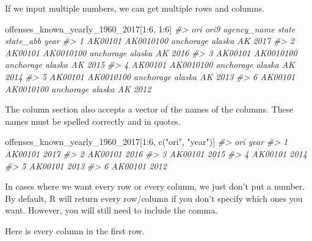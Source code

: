 \documentclass[
]{krantz}
\makeatletter
\newenvironment{Shaded}{\begin{snugshade}}{\end{snugshade}}
\newcommand{\CommentTok}[1]{\textcolor[rgb]{0.37,0.37,0.37}{\textit{#1}}}
\newcommand{\DecValTok}[1]{\textcolor[rgb]{0.06,0.06,0.06}{#1}}
\newcommand{\FunctionTok}[1]{\textcolor[rgb]{0,0,0}{#1}}
\newcommand{\NormalTok}[1]{#1}
\newcommand{\SpecialCharTok}[1]{\textcolor[rgb]{0,0,0}{#1}}
\newcommand{\StringTok}[1]{\textcolor[rgb]{0.5,0.5,0.5}{#1}}
\newenvironment{kframe}{%
\medskip{}
\setlength{\fboxsep}{.8em}
 \def\at@end@of@kframe{}%
 \ifinner\ifhmode%
  \def\at@end@of@kframe{\end{minipage}}%
  \begin{minipage}{\columnwidth}%
 \fi\fi%
 \def\FrameCommand##1{\hskip\@totalleftmargin \hskip-\fboxsep
 \colorbox{shadecolor}{##1}\hskip-\fboxsep
     \hskip-\linewidth \hskip-\@totalleftmargin \hskip\columnwidth}%
 \MakeFramed {\advance\hsize-\width
   \@totalleftmargin\z@ \linewidth\hsize
   \@setminipage}}%
 {\par\unskip\endMakeFramed%
 \at@end@of@kframe}
\renewenvironment{Shaded}{\begin{kframe}}{\end{kframe}}
\makeatother
\begin{document}
If we input multiple numbers, we can get multiple rows and columns.

\begin{Shaded}
\begin{Highlighting}[]
\NormalTok{offenses\_known\_yearly\_1960\_2017[}\DecValTok{1}\SpecialCharTok{:}\DecValTok{6}\NormalTok{, }\DecValTok{1}\SpecialCharTok{:}\DecValTok{6}\NormalTok{]}
\CommentTok{\#\textgreater{}       ori      ori9 agency\_name  state state\_abb year}
\CommentTok{\#\textgreater{} 1 AK00101 AK0010100   anchorage alaska        AK 2017}
\CommentTok{\#\textgreater{} 2 AK00101 AK0010100   anchorage alaska        AK 2016}
\CommentTok{\#\textgreater{} 3 AK00101 AK0010100   anchorage alaska        AK 2015}
\CommentTok{\#\textgreater{} 4 AK00101 AK0010100   anchorage alaska        AK 2014}
\CommentTok{\#\textgreater{} 5 AK00101 AK0010100   anchorage alaska        AK 2013}
\CommentTok{\#\textgreater{} 6 AK00101 AK0010100   anchorage alaska        AK 2012}
\end{Highlighting}
\end{Shaded}

The column section also accepts a vector of the names of the columns. These names must be spelled correctly and in quotes.

\begin{Shaded}
\begin{Highlighting}[]
\NormalTok{offenses\_known\_yearly\_1960\_2017[}\DecValTok{1}\SpecialCharTok{:}\DecValTok{6}\NormalTok{, }\FunctionTok{c}\NormalTok{(}\StringTok{"ori"}\NormalTok{, }\StringTok{"year"}\NormalTok{)]}
\CommentTok{\#\textgreater{}       ori year}
\CommentTok{\#\textgreater{} 1 AK00101 2017}
\CommentTok{\#\textgreater{} 2 AK00101 2016}
\CommentTok{\#\textgreater{} 3 AK00101 2015}
\CommentTok{\#\textgreater{} 4 AK00101 2014}
\CommentTok{\#\textgreater{} 5 AK00101 2013}
\CommentTok{\#\textgreater{} 6 AK00101 2012}
\end{Highlighting}
\end{Shaded}

In cases where we want every row or every column, we just don't put a number. By default, R will return every row/column if you don't specify which ones you want. However, you will still need to include the comma.

Here is every column in the first row.
\end{document}
